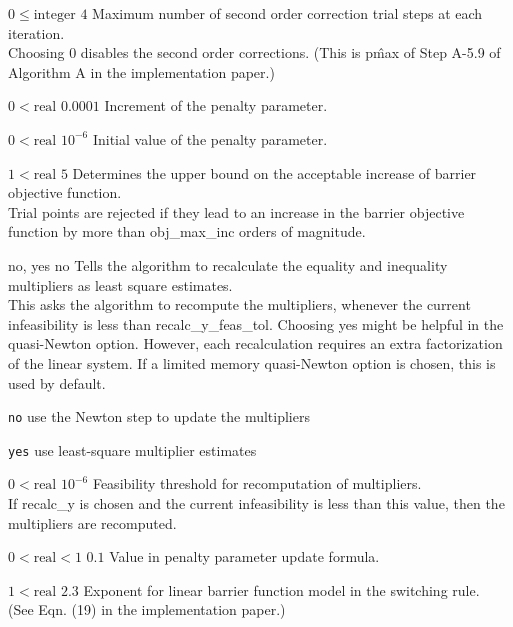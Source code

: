 %
{$0\leq\textrm{integer}$}%
{$4$}%
{Maximum number of second order correction trial steps at each iteration.\\
Choosing 0 disables the second order corrections. (This is p\^{max} of Step A-5.9 of Algorithm A in the implementation paper.)}%
{}

%
{$0<\textrm{real}$}%
{$0.0001$}%
{Increment of the penalty parameter.}%
{}

%
{$0<\textrm{real}$}%
{$10^{- 6}$}%
{Initial value of the penalty parameter.}%
{}

%
{$1<\textrm{real}$}%
{$5$}%
{Determines the upper bound on the acceptable increase of barrier objective function.\\
Trial points are rejected if they lead to an increase in the barrier objective function by more than obj\_max\_inc orders of magnitude.}%
{}

%
{\ttfamily no, yes}%
{no}%
{Tells the algorithm to recalculate the equality and inequality multipliers as least square estimates.\\
This asks the algorithm to recompute the multipliers, whenever the current infeasibility is less than recalc\_y\_feas\_tol. Choosing yes might be helpful in the quasi-Newton option.  However, each recalculation requires an extra factorization of the linear system.  If a limited memory quasi-Newton option is chosen, this is used by default.}%
{\begin{list}{}{
\setlength{\parsep}{0em}
\setlength{\leftmargin}{5ex}
\setlength{\labelwidth}{2ex}
\setlength{\itemindent}{0ex}
\setlength{\topsep}{0pt}}
\item[\texttt{no}] use the Newton step to update the multipliers
\item[\texttt{yes}] use least-square multiplier estimates
\end{list}
}

%
{$0<\textrm{real}$}%
{$10^{- 6}$}%
{Feasibility threshold for recomputation of multipliers.\\
If recalc\_y is chosen and the current infeasibility is less than this value, then the multipliers are recomputed.}%
{}

%
{$0<\textrm{real}<1$}%
{$0.1$}%
{Value in penalty parameter update formula.}%
{}

%
{$1<\textrm{real}$}%
{$2.3$}%
{Exponent for linear barrier function model in the switching rule.\\
(See Eqn. (19) in the implementation paper.)}%
{}

